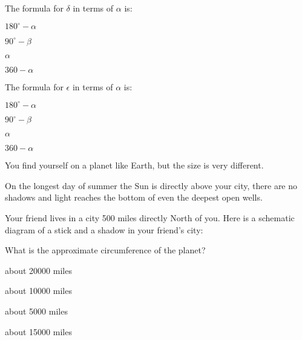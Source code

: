 \documentclass{../ximera}
\begin{document}
\begin{exercise}
 The formula for $\delta$ in terms of $\alpha$ is:
 
\begin{enumerate}
\begin{multicols}{2}
 \item $180^\circ-\alpha$
 \item $90^\circ-\beta$
 \item $\alpha$
 \item $360-\alpha$
\end{multicols}
\end{enumerate}
\end{exercise}

\begin{exercise}
 The formula for $\epsilon$ in terms of $\alpha$ is:
 
\begin{enumerate}
\begin{multicols}{2}
 \item $180^\circ-\alpha$
 \item $90^\circ-\beta$
 \item $\alpha$
 \item $360-\alpha$
\end{multicols}
\end{enumerate}
\end{exercise}

\begin{exercise}
 You find yourself on a planet like Earth, but the size is very different. 
 
 On the longest day of summer the Sun is directly above your city, there are no shadows and light reaches the bottom of even the deepest open wells.

Your friend lives in a city 500 miles directly North of you. Here is a schematic diagram of a stick and a shadow in your friend's city:
  \begin{center}
    \end{center}
    
What is the approximate circumference of the planet?
\begin{enumerate}
\begin{multicols}{2}
 \item about 20000 miles
 \item about 10000 miles
 \item about 5000 miles
 \item about 15000 miles
\end{multicols}
 \end{enumerate}
\end{exercise}

\end{document}
